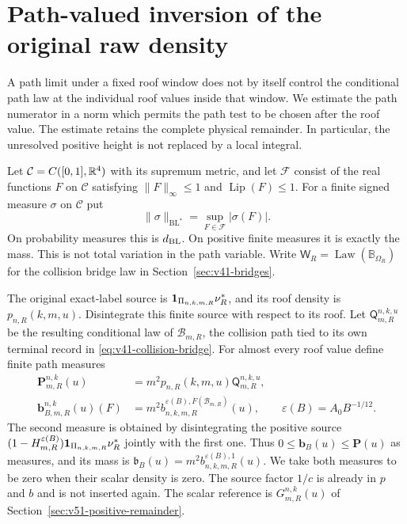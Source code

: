 \section{Path-valued inversion of the original raw density}
\label{sec:v52-path-inversion}
A path limit under a fixed roof window does not by itself control the
conditional path law at the individual roof values inside that window.
We estimate the path numerator in a norm which permits the path test to
be chosen after the roof value. The estimate retains the complete
physical remainder. In particular, the unresolved positive height is
not replaced by a local integral.

Let $\mathcal C=C([0,1],\mathbb R^4)$ with its supremum metric, and let
$\mathcal F$ consist of the real functions $F$ on $\mathcal C$ satisfying
$\|F\|_\infty\le1$ and $\operatorname{Lip}(F)\le1$. For a finite signed
measure $\sigma$ on $\mathcal C$ put
\[
 \|\sigma\|_{\mathrm{BL}^*}=\sup_{F\in\mathcal F}|\sigma(F)|.
\]
On probability measures this is $d_{\rm BL}$. On positive finite
measures it is exactly the mass. This is not total variation in the
path variable. Write $\mathsf W_R=\operatorname{Law}(\mathbb B_{\Omega_R})$
for the collision bridge law in Section~\ref{sec:v41-bridges}.

The original exact-label source is
$\mathbf1_{\Pi_{n,k,m,R}}\nu_R^*$, and its roof density is $p_{n,R}(k,m,u)$.
Disintegrate this finite source with respect to its roof. Let
$\mathsf Q_{m,R}^{n,k,u}$ be the resulting conditional law of
$\mathcal B_{m,R}$, the collision path tied to its own terminal record
in \eqref{eq:v41-collision-bridge}. For almost every roof value define
finite path measures
\begin{align}
 \mathbf P_{m,R}^{n,k}(u)&=m^2p_{n,R}(k,m,u)\mathsf Q_{m,R}^{n,k,u},
                                      \label{eq:v52-path-density}\\
 \mathbf b_{B,m,R}^{n,k}(u)(F)
  &=m^2b^{\varepsilon(B),F(\mathcal B_{m,R})}_{n,k,m,R}(u),
 \qquad \varepsilon(B)=A_0B^{-1/12}.    \label{eq:v52-bad-path-density}
\end{align}
The second measure is obtained by disintegrating the positive source
$(1-H_{m,R}^{\varepsilon(B)})\mathbf1_{\Pi_{n,k,m,R}}\nu_R^*$ jointly
with the first one. Thus
$0\le\mathbf b_B(u)\le\mathbf P(u)$ as measures, and its mass is
$\mathfrak b_B(u)=m^2b^{\varepsilon(B),1}_{n,k,m,R}(u)$.
We take both measures to be zero when their scalar density is zero.
The source factor $1/c$ is already in $p$ and $b$ and is not inserted
again. The scalar reference is $G_{m,R}^{n,k}(u)$ of
Section~\ref{sec:v51-positive-remainder}.

